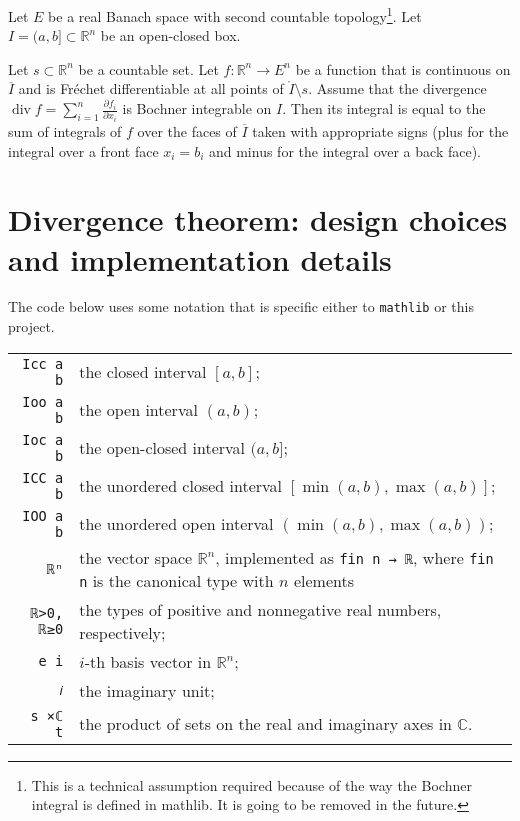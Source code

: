 \documentclass[a4paper, UKenglish,cleveref, autoref, thm-restate]{lipics-v2021}
\newcommand{\bbR}{\mathbb{R}}
\newcommand{\bbC}{\mathbb{C}}
\DeclareMathOperator{\divg}{div}
\begin{document}
\begin{theorem}%
  \label{thm:divergence-Bochner}
  Let \(E\) be a real Banach space with second countable
  topology\footnote{This is a technical assumption required because of
    the way the Bochner integral is defined in mathlib. It is going to
    be removed in the future.}. Let \(I=(a,b]\subset\bbR^{n}\) be an
  open-closed box.

  Let \(s \subset\bbR^{n}\) be a countable set. Let
  \(f\colon \bbR^{n}\to E^{n}\) be a function that is continuous on
  \(\overline I\) and is Fréchet differentiable at all points of
  \(\mathring I \setminus s\). Assume that the divergence
  \(\divg f=\sum_{i=1}^{n}\frac{\partial f_{i}}{\partial x_{i}}\) is
  Bochner integrable on \(I\). Then its integral is equal to the sum
  of integrals of \(f\) over the faces of \(\overline I\) taken with
  appropriate signs (plus for the integral over a front face
  \(x_{i}=b_{i}\) and minus for the integral over a back face).
\end{theorem}

\section{Divergence theorem: design choices and implementation details}%
\label{sec:GP-impl}
The code below uses some notation that is specific either to
\texttt{mathlib} or this project.

\noindent
\begin{tabular}{rp{12cm}}
  \lstinline=Icc a b=& the closed interval \([a, b]\);\\
  \lstinline=Ioo a b= & the open interval \((a, b)\);\\
  \lstinline=Ioc a b= & the open-closed interval \((a, b]\);\\
  \lstinline=ICC a b=& the unordered closed interval \([\min(a, b), \max(a, b)]\);\\
  \lstinline=IOO a b=& the unordered open interval \((\min(a, b), \max(a, b))\);\\
  \lstinline=ℝⁿ=& the vector space \(\bbR^{n}\), implemented as \lstinline=fin n → ℝ=,
                  where \lstinline+fin n+ is the canonical type with \(n\) elements\\
  \lstinline=ℝ>0, ℝ≥0= & the types of positive and nonnegative real numbers, respectively;\\
  \lstinline=e i= & \(i\)-th basis vector in \(\bbR^{n}\);\\
  \lstinline=𝑖= & the imaginary unit;\\
  \lstinline=s ×ℂ t= & the product of sets on the real and imaginary axes in \(\bbC\).
\end{tabular}
\end{document}
